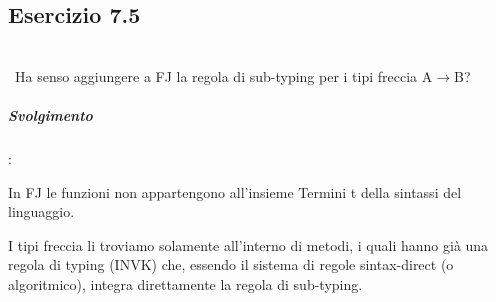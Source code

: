 \subsection*{Esercizio 7.5}\
\\
\
Ha senso aggiungere a FJ la regola di sub-typing per i tipi freccia A$\rightarrow$B?


\vspace{0,5cm}
\noindent
\subparagraph{Svolgimento}:

\vspace{0,3cm}
In FJ le funzioni non appartengono all'insieme Termini t della sintassi del linguaggio.

I tipi freccia li troviamo solamente all'interno di metodi, i quali hanno gi\`a una regola di typing (INVK) che, essendo il sistema di  regole sintax-direct (o algoritmico), integra direttamente la regola di sub-typing.


 